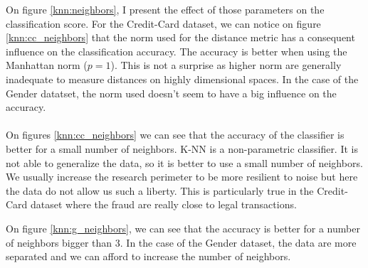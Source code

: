 \documentclass[10pt]{article}
\begin{document}
			On figure \ref{knn:neighbors}, I present the effect of those parameters on the classification score.
			For the Credit-Card dataset, we can notice on figure \ref{knn:cc_neighbors} that the norm used for the distance metric has a consequent influence on the classification accuracy. The accuracy is better when using the Manhattan norm ($p = 1$). This is not a surprise as higher norm are generally inadequate to measure distances on highly dimensional spaces. In the case of the Gender datatset, the norm used doesn't seem to have a big influence on the accuracy.

		\paragraph*{}
			On figures \ref{knn:cc_neighbors} we can see that the accuracy of the classifier is better for a small number of neighbors. K-NN is a non-parametric classifier. It is not able to generalize the data, so it is better to use a small number of neighbors. We usually increase the research perimeter to be more resilient to noise but here the data do not allow us such a liberty. This is particularly true in the Credit-Card dataset where the fraud are really close to legal transactions.

			On figure \ref{knn:g_neighbors}, we can see that the accuracy is better for a number of neighbors bigger than 3. In the case of the Gender dataset, the data are more separated and we can afford to increase the number of neighbors.
\end{document}
